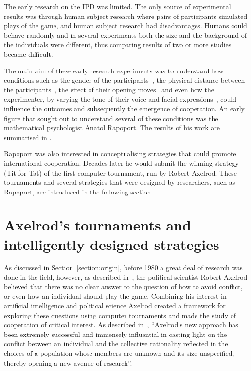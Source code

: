 The early research on the IPD was limited. The only source of
experimental results was through human subject research where pairs of
participants simulated plays of the game, and human subject research had
disadvantages. Humans could behave randomly and in several experiments both the
size and the background of the individuals were different, thus comparing
results of two or more studies became difficult.

The main aim of these early research experiments was to understand how
conditions such as the gender of the participants~\cite{Evans1966, Lutzker1961,
Mack1971}, the physical distance between the participants~\cite{Sensenig1972}, the
effect of their opening moves~\cite{Tedeschi1968} and even how the experimenter, by varying
the tone of their voice and facial expressions~\cite{Gallo1968}, could influence
the outcomes and subsequently the emergence of cooperation. An early figure that
sought out to understand several of these conditions was the mathematical
psychologist Anatol Rapoport. The results of his work are summarised
in \cite{rapoport1965}.

Rapoport was also interested in conceptualising strategies that could promote
international cooperation. Decades later he would submit the winning strategy
(Tit for Tat) of the first computer tournament, run by Robert Axelrod.
These tournaments and several strategies that were designed by researchers, such
as Rapoport, are introduced in the following section.

\section{Axelrod's tournaments and intelligently designed strategies}
\label{section:intelligent_design}

As discussed in Section~\ref{section:origin}, before 1980 a great deal of
research was done in the field, however, as described in~\cite{Axelrod2012}, the
political scientist Robert Axelrod believed that there was no clear answer to the
question of how to avoid conflict, or even how an individual should play the
game. Combining his interest in artificial intelligence and political science
Axelrod created a framework for exploring these questions using computer
tournaments and made the study of cooperation of critical interest. As
described in~\cite{Rapoport2015}, ``Axelrod's new approach has been extremely
successful and immensely influential in casting light on the conflict between an
individual and the collective rationality reflected in the choices of a
population whose members are unknown and its size unspecified, thereby opening a
new avenue of research''.

